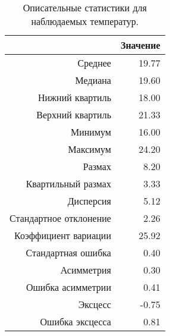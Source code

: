 \begin{table}[ht]
\centering
\caption{Описательные статистики для наблюдаемых температур.} 
\label{table:dstats}
\begin{tabular}{rr}
  \hline
 & Значение \\ 
  \hline
Среднее & 19.77 \\ 
  Медиана & 19.60 \\ 
  Нижний квартиль & 18.00 \\ 
  Верхний квартиль & 21.33 \\ 
  Минимум & 16.00 \\ 
  Максимум & 24.20 \\ 
  Размах & 8.20 \\ 
  Квартильный размах & 3.33 \\ 
  Дисперсия & 5.12 \\ 
  Стандартное отклонение & 2.26 \\ 
  Коэффициент вариации & 25.92 \\ 
  Стандартная ошибка & 0.40 \\ 
  Асимметрия & 0.30 \\ 
  Ошибка асимметрии & 0.41 \\ 
  Эксцесс & -0.75 \\ 
  Ошибка эксцесса & 0.81 \\ 
   \hline
\end{tabular}
\end{table}
